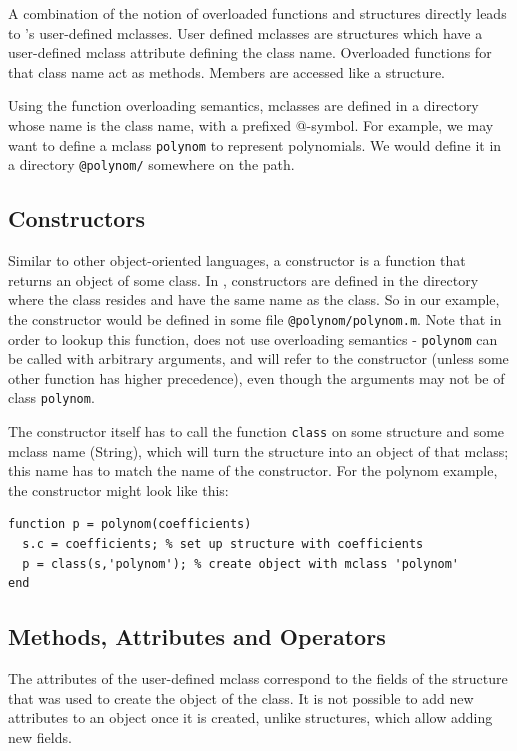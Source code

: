 A combination of the notion of overloaded functions and structures directly leads to \matlab's
user-defined mclasses. User defined mclasses are structures which have a user-defined
mclass attribute defining the class name. Overloaded functions for that class name act
as methods. Members are accessed like a structure.

Using the function overloading semantics, mclasses are defined in a directory whose name is the
class name, with a prefixed @-symbol. For example, we may want to define a mclass
{\tt polynom} to represent polynomials. We would define it in a directory {\tt @polynom/} somewhere
on the path.

\subsection{Constructors}

Similar to other object-oriented languages, a constructor is a function that returns
an object of some class. In \matlab, constructors are defined in the directory where the class
resides and have the same name as the class. So in our example, the constructor would be defined
in some file {\tt @polynom/polynom.m}. Note that in order to lookup this function, \matlab
does not use overloading semantics - {\tt polynom} can be called with arbitrary arguments, 
and will refer to the constructor (unless some other function has higher precedence), even though 
the arguments may not be of class {\tt polynom}.

The constructor itself has to call the function {\tt class} on some structure and some mclass name (String),
which will turn the structure into an object of that mclass; this name has to match the name of the
constructor. For the polynom example, the constructor might look like this:

\vspace{-.5cm}
\begin{lstlisting}
function p = polynom(coefficients)
  s.c = coefficients; % set up structure with coefficients
  p = class(s,'polynom'); % create object with mclass 'polynom'
end
\end{lstlisting}


\subsection{Methods, Attributes and Operators}
The attributes of the user-defined mclass correspond to the fields of the structure that was used
to create the object of the class. It is not possible to add new attributes to an object once it
is created, unlike structures, which allow adding new fields.

